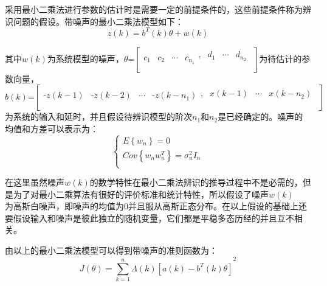 采用最小二乘法进行参数的估计时是需要一定的前提条件的，这些前提条件称为辨识问题的假设。带噪声的最小二乘法模型如下：
\begin{equation}
z\left( k \right)={{b}^{T}}(k)\theta +w(k)
\end{equation}

其中$w(k)$为系统模型的噪声，$\theta \text{=}\left[ \begin{matrix}
   {{c}_{1}} & {{c}_{2}} & \cdots  & {{c}_{{{n}_{1}}}}\begin{matrix}
   , & {{d}_{1}} & \cdots  & {{d}_{{{n}_{2}}}}  \\
\end{matrix}  \\
\end{matrix} \right]$为待估计的参数向量，$b(k)\text{=}\left[ \begin{matrix}
   \text{-}z\left( k-1 \right) & \text{-}z\left( k-2 \right) & \cdots  & \text{-}z\left( k-{{n}_{1}} \right)\begin{matrix}
   , & x\left( k-1 \right) & \cdots  & x\left( k-{{n}_{2}} \right)  \\
\end{matrix}  \\
\end{matrix} \right]$\\为系统的输入和延时，并且假设待辨识模型的阶次${{n}_{1}}$和${{n}_{2}}$是已经确定的。噪声的均值和方差可以表示为：
\begin{equation}
\left\{  \begin{array}{l}
   E\left\{ {{w}_{n}} \right\}=0 \\ 
  Cov\left\{ {{w}_{n}}w_{n}^{T} \right\}=\sigma _{n}^{2}{{I}_{n}} \\ 
\end{array} \right.
\end{equation}

在这里虽然噪声$w(k)$的数学特性在最小二乘法辨识的推导过程中不是必需的，但是为了对最小二乘算法有很好的评价标准和统计特性，所以假设了噪声$w(k)$\\为高斯白噪声，即噪声的均值为0并且服从高斯正态分布。在以上假设的基础上还要假设输入和噪声是彼此独立的随机变量，它们都是平稳多态历经的并且互不相关。

由以上的最小二乘法模型可以得到带噪声的准则函数为：
\begin{equation}
J\left( \theta  \right)={{\sum\limits_{k=1}^{n}{\Lambda \left( k \right)\left[ a(k)-{{b}^{T}}(k)\theta  \right]}}^{2}}
\end{equation}

